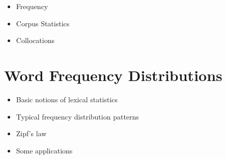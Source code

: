 \documentclass[a4paper,landscape,headrule,footrule,xetex]{foils}
\begin{document}

\maketitle



\begin{itemize} 
\item Frequency
\item Corpus Statistics
\item Collocations
\end{itemize}

%



\section{Word Frequency Distributions}



\begin{itemize}
\item Basic notions of lexical statistics
\item Typical frequency distribution patterns
\item Zipf's law
\item Some applications
\end{itemize}

\end{document}
